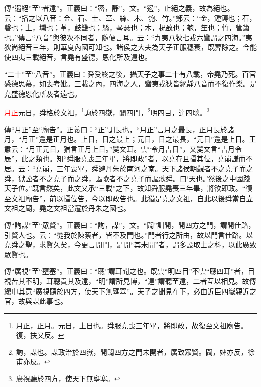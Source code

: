 {\noindent\zhuan{}\fzbyks 傳“遏絕”至“者遠”。正義曰：“密，靜”，文。“遏”，止絕之義，故為絕也。云：“播之以八音：金、石、土、革、絲、木、匏、竹。”鄭云：“金，鍾鎛也；石，磬也；土，壎也；革，鼓鼗也；絲，琴瑟也；木，柷敔也；匏，笙也；竹，管簫也。”傳言“八音”與彼次不同者，隨便言耳。云：“九夷八狄七戎六蠻謂之四海。”夷狄尚絕音三年，則華夏內國可知也。諸侯之大夫為天子正服穗衰，既葬除之。今能使四夷三載絕音，言堯有盛德，恩化所及遠也。 \par}

{\noindent\shu{}\fzkt “二十”至“八音”。正義曰：舜受終之後，攝天子之事二十有八載，帝堯乃死。百官感德思慕，如喪考妣。三載之內，四海之人，蠻夷戎狄皆絕靜八音而不復作樂。是堯盛德恩化所及者遠也。 \par}

\textcolor{red}{月正}元日，舜格於文祖，\footnote{月正，正月。元日，上日也。舜服堯喪三年畢，將即政，故復至文祖廟告。復，扶又反。}詢於四嶽，闢四門，\footnote{詢，謀也。謀政治於四嶽，開闢四方之門未開者，廣致眾賢。闢，婢亦反，徐甫亦反。}明四目，達四聰。\footnote{廣視聽於四方，使天下無壅塞。}

{\noindent\zhuan{}\fzbyks 傳“月正”至“廟告”。正義曰：“正”訓長也，“月正”言月之最長，正月長於諸月，“月正”還是正月也。上日，日之最上；元日，日之最長，“元日”還是上日。王肅云：“月正元日，猶言正月上日。”變文耳。雲“令月吉日”，又變文言“吉月令辰”，此之類也。知“舜服堯喪三年畢，將即政”者，以堯存且攝其位，堯崩謙而不居。云：“堯崩，三年喪畢，舜避丹朱於南河之南。天下諸侯朝覲者不之堯子而之舜，獄訟者不之堯子而之舜，謳歌者不之堯子而謳歌舜。曰‘天也。’然後之中國踐天子位。”既言然矣，此文又承“三載”之下，故知舜服堯喪三年畢，將欲即政。“復至文祖廟告”，前以攝位告，今以即政告也。此猶是堯之文祖，自此以後舜當自立文祖之廟，堯之文祖當遷於丹朱之國也。 \par}

{\noindent\zhuan{}\fzbyks 傳“詢謀”至“眾賢”。正義曰：“詢，謀”，文。“闢”訓開，開四方之門，謂開仕路，引賢人也。云：“從我於陳蔡者，皆不及門也。”門者行之所由，故以門言仕路。以堯舜之聖，求賢久矣，今更言開門，是開“其未開”者，謂多設取士之科，以此廣致眾賢也。 \par}

{\noindent\zhuan{}\fzbyks 傳“廣視”至“壅塞”。正義曰：“聰”謂耳聞之也。既雲“明四目”不雲“聰四耳”者，目視苦其不明，耳聰貴其及遠，“明”謂所見博，“達”謂聽至遠，二者互以相見。故傳總申其意“廣視聽於四方，使天下無壅塞”。天子之聞見在下，必由近臣四嶽親近之官，故與謀此事也。 \par}

